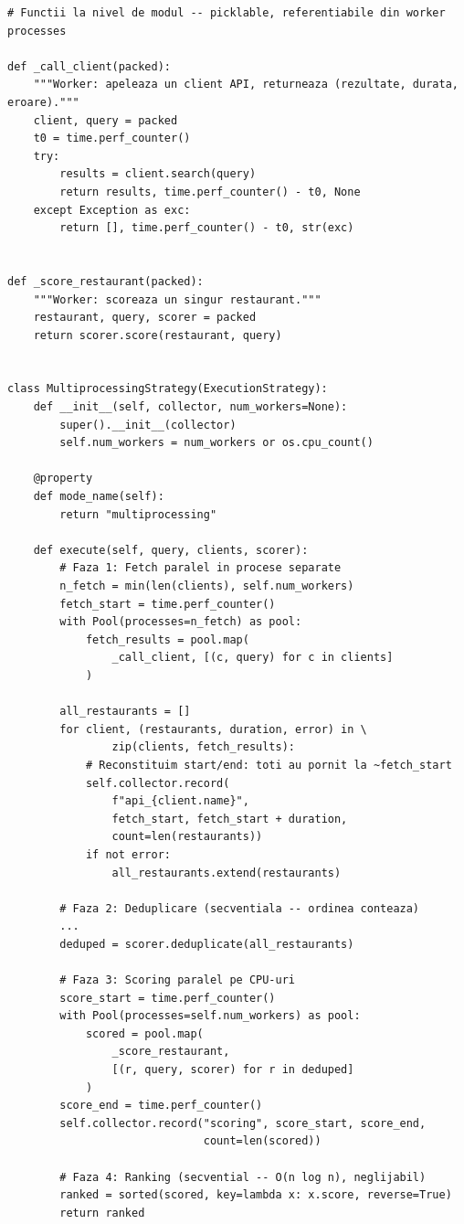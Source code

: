 \documentclass[12pt,a4paper]{article}
\begin{document}
\begin{lstlisting}[caption={Funcții worker (module-level) și MultiprocessingStrategy}]
# Functii la nivel de modul -- picklable, referentiabile din worker processes

def _call_client(packed):
    """Worker: apeleaza un client API, returneaza (rezultate, durata, eroare)."""
    client, query = packed
    t0 = time.perf_counter()
    try:
        results = client.search(query)
        return results, time.perf_counter() - t0, None
    except Exception as exc:
        return [], time.perf_counter() - t0, str(exc)


def _score_restaurant(packed):
    """Worker: scoreaza un singur restaurant."""
    restaurant, query, scorer = packed
    return scorer.score(restaurant, query)


class MultiprocessingStrategy(ExecutionStrategy):
    def __init__(self, collector, num_workers=None):
        super().__init__(collector)
        self.num_workers = num_workers or os.cpu_count()

    @property
    def mode_name(self):
        return "multiprocessing"

    def execute(self, query, clients, scorer):
        # Faza 1: Fetch paralel in procese separate
        n_fetch = min(len(clients), self.num_workers)
        fetch_start = time.perf_counter()
        with Pool(processes=n_fetch) as pool:
            fetch_results = pool.map(
                _call_client, [(c, query) for c in clients]
            )

        all_restaurants = []
        for client, (restaurants, duration, error) in \
                zip(clients, fetch_results):
            # Reconstituim start/end: toti au pornit la ~fetch_start
            self.collector.record(
                f"api_{client.name}",
                fetch_start, fetch_start + duration,
                count=len(restaurants))
            if not error:
                all_restaurants.extend(restaurants)

        # Faza 2: Deduplicare (secventiala -- ordinea conteaza)
        ...
        deduped = scorer.deduplicate(all_restaurants)

        # Faza 3: Scoring paralel pe CPU-uri
        score_start = time.perf_counter()
        with Pool(processes=self.num_workers) as pool:
            scored = pool.map(
                _score_restaurant,
                [(r, query, scorer) for r in deduped]
            )
        score_end = time.perf_counter()
        self.collector.record("scoring", score_start, score_end,
                              count=len(scored))

        # Faza 4: Ranking (secvential -- O(n log n), neglijabil)
        ranked = sorted(scored, key=lambda x: x.score, reverse=True)
        return ranked
\end{lstlisting}
\end{document}
